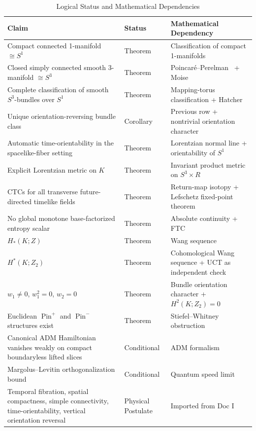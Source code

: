 \documentclass[11pt]{article}
\theoremstyle{canonmath}
\theoremstyle{canonpostulate}
\theoremstyle{canonproposition}
\providecommand{\Klein}{\mathcal{K}}
\providecommand{\R}{\mathbb{R}}
\providecommand{\Z}{\mathbb{Z}}
\providecommand{\Ztwo}{\mathbb{Z}_2}
\providecommand{\Sone}{S^1}
\providecommand{\Sthree}{S^3}
\providecommand{\Pin}{\operatorname{Pin}}
\def\mathbb#1{#1}%
\def\mathcal#1{#1}%
\begin{document}
\begin{table}[htbp]
\centering
\caption{Logical Status and Mathematical Dependencies}
\label{tab:math}
\renewcommand{\arraystretch}{1.2}
\begin{tabularx}{\textwidth}{>{\raggedright\arraybackslash}X >{\raggedright\arraybackslash}p{2.8cm} >{\raggedright\arraybackslash}p{4.2cm}}
\toprule
\textbf{Claim} & \textbf{Status} & \textbf{Mathematical Dependency} \\
\midrule
Compact connected 1-manifold $\cong \Sone$ & Theorem & Classification of compact 1-manifolds \\
Closed simply connected smooth 3-manifold $\cong \Sthree$ & Theorem & Poincar\'e--Perelman~\cite{perelman,perelmanSurgery,perelmanExtinction} + Moise~\cite{moise} \\
Complete classification of smooth $\Sthree$-bundles over $\Sone$ & Theorem & Mapping-torus classification + Hatcher~\cite{hatcher} \\
Unique orientation-reversing bundle class & Corollary & Previous row + nontrivial orientation character \\
Automatic time-orientability in the spacelike-fiber setting & Theorem & Lorentzian normal line + orientability of $S^1$ \\
Explicit Lorentzian metric on $\Klein$ & Theorem & Invariant product metric on $\Sthree\times\R$ \\
CTCs for all transverse future-directed timelike fields & Theorem & Return-map isotopy + Lefschetz fixed-point theorem \\
No global monotone base-factorized entropy scalar & Theorem & Absolute continuity + FTC \\
$H_*(\Klein;\Z)$ & Theorem & Wang sequence \\
$H^*(\Klein;\Ztwo)$ & Theorem & Cohomological Wang sequence + UCT as independent check \\
$w_1\neq0$, $w_1^2=0$, $w_2=0$ & Theorem & Bundle orientation character + $H^2(\Klein;\Ztwo)=0$ \\
Euclidean $\Pin^+$ and $\Pin^-$ structures exist & Theorem & Stiefel--Whitney obstruction~\cite{kirby} \\
Canonical ADM Hamiltonian vanishes weakly on compact boundaryless lifted slices & Conditional & ADM formalism~\cite{wald,adm} \\
Margolus--Levitin orthogonalization bound & Conditional & Quantum speed limit~\cite{margolus} \\
\midrule
Temporal fibration, spatial compactness, simple connectivity, time-orientability, vertical orientation reversal & Physical Postulate & Imported from Doc I~\cite{CanonWhy} \\
\bottomrule
\end{tabularx}
\end{table}
\end{document}
